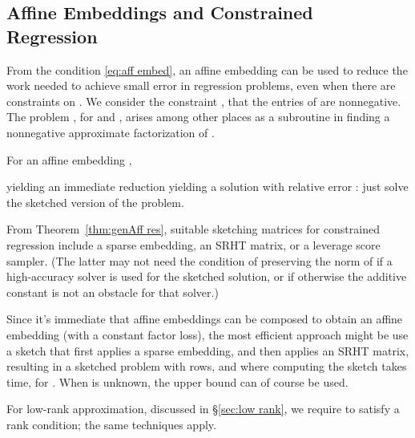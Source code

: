 \documentclass{sig-alternate}
\begin{document}
\subsection{Affine Embeddings and Constrained Regression}\label{subsec:constrained}


From the condition \eqref{eq:aff embed}, an affine embedding
can be used to reduce the work needed to achieve small
error in regression problems, even when there are constraints
on . We consider the constraint , that the entries
of  are nonnegative. The problem
,
for  and ,
arises among other places as a subroutine in finding
a nonnegative approximate factorization of .

For an affine embedding ,

yielding an immediate reduction yielding a solution with relative
error : just solve the sketched version of the problem.

From Theorem~\ref{thm:genAff res}, suitable
sketching matrices for constrained regression
include a sparse embedding, 
an SRHT matrix, or a leverage
score sampler. (The latter may not need the condition
of preserving the norm of  if a high-accuracy
solver is used for the sketched solution, or if otherwise
the additive constant is not an obstacle for that solver.)

Since it's immediate that affine embeddings can be composed
to obtain an affine embedding (with a constant factor loss),
the most efficient approach might be use a sketch
that first applies a sparse embedding, and then
applies an SRHT matrix, resulting
in a sketched problem with  rows,
and where computing the
sketch takes  time,
for . When  is unknown, the upper
bound  can of course be used.

For low-rank approximation, discussed in \S\ref{sec:low rank},
we require  to satisfy a rank condition; the same techniques apply.


\iffalse
Another way to apply our techniques, which is more expensive
but yields higher quality answers, is as follows:
first factor  as , with
 having orthormal columns and  upper triangular.
From Fact~\ref{fact:normal}, the normal equations,

where ,
using here the fact that  has orthonormal columns.

Thus after solving a generalized regression problem,
it remains to solve ,
that is, to find for each column of  the
nearest vector in the cone generated by the columns of~.
For the given column, this problem can be solved in  time,
so that the cost for all columns is . 
\fi
\end{document}
